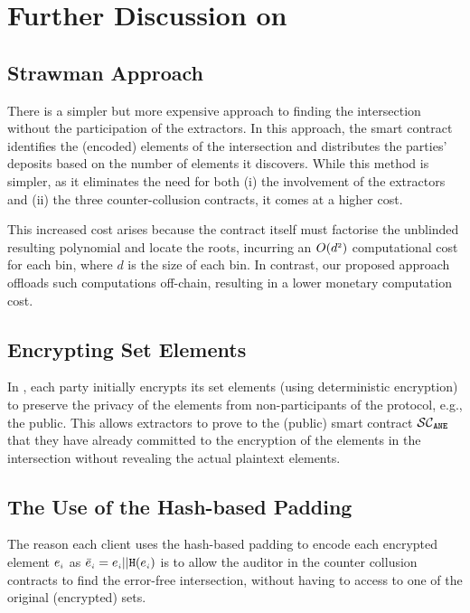 


\section{Further Discussion on \withRew}\label{sec::Discussion-Anesidora}



\subsection{Strawman Approach}


There is a simpler but more expensive approach to finding the intersection without the participation of the extractors. In this approach, the smart contract identifies the (encoded) elements of the intersection and distributes the parties' deposits based on the number of elements it discovers. While this method is simpler, as it eliminates the need for both (i) the involvement of the extractors and (ii) the three counter-collusion contracts, it comes at a higher cost.

This increased cost arises because the contract itself must factorise the unblinded resulting polynomial and locate the roots, incurring an $O(d^{\scriptscriptstyle 2})$ computational cost for each bin, where $d$ is the size of each bin. In contrast, our proposed approach offloads such computations off-chain, resulting in a lower monetary computation cost.



 
\subsection{Encrypting Set Elements}
In \epsi, each party initially encrypts its set elements (using deterministic encryption) to preserve the privacy of the elements from non-participants of the protocol, e.g., the public. This allows extractors to prove to the (public) smart contract $\mathcal{SC}_{\mathtt{ANE}}$ that they have already committed to the encryption of the elements in the intersection without revealing the actual plaintext elements. 


 
\subsection{The Use of the Hash-based Padding}
The reason each client uses the hash-based padding to encode each encrypted element $e_{\scriptscriptstyle i}$  as $\bar{e}_{\scriptscriptstyle i} =e_{\scriptscriptstyle i} || \mathtt{H}(e_{\scriptscriptstyle i})$ is to allow the auditor in the counter collusion contracts to find the error-free intersection, without having to access to one of the original (encrypted) sets. 




